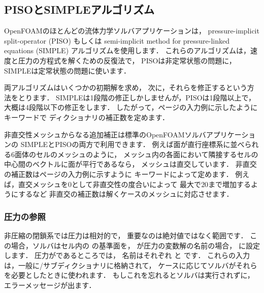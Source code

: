\subsection{PISOとSIMPLEアルゴリズム}
\label{ssec:4.5.3}
OpenFOAMのほとんどの流体力学ソルバアプリケーションは，
pressure-implicit split-operator (PISO) もしくは
semi-implicit method for pressure-linked equations
(SIMPLE) アルゴリズムを使用します．
これらのアルゴリズムは，速度と圧力の方程式を解くための反復法で，
PISOは非定常状態の問題に，SIMPLEは定常状態の問題に使います．

両アルゴリズムはいくつかの初期解を求め，
次に，それらを修正するという方法をとります．
SIMPLEは1段階の修正しかしませんが，PISOは1段階以上で，大概は4段階以下の修正をします．
したがって，\pageref{p:U-117}ページの入力例に示したようにキーワードで
ディクショナリの補正数を定めます．

非直交性メッシュからなる追加補正は標準のOpenFOAMソルバアプリケーションの
SIMPLEとPISOの両方で利用できます．
例えば面が直行座標系に並べられる6面体のセルのメッシュのように，
メッシュ内の各面において隣接するセルの中心間のベクトルに面が平行であるなら，
メッシュは直交しています．
非直交の補正数は\pageref{p:U-117}ページの入力例に示すように
キーワードによって定めます．
例えば，直交メッシュを$0$として非直交性の度合いによって
最大で$20$まで増加するようにするなど
非直交の補正数は解くケースのメッシュに対応させます．

\subsubsection{圧力の参照}
\label{sssec:4.5.3.1}
非圧縮の閉鎖系では圧力は相対的で，
重要なのは絶対値ではなく範囲です．
この場合，ソルバはセル内の
%
%
の基準面を，
が圧力の変数解の名前の場合，
%
%
に設定します．
圧力がであるところでは，
名前はそれぞれ
%
%
と
%
%
です．
これらの入力は，一般に/サブディクショナリに格納されて，
ケースに応じてソルバがそれらを必要としたときに使われます．
もしこれを忘れるとソルバは実行されずに，エラーメッセージが出ます．


